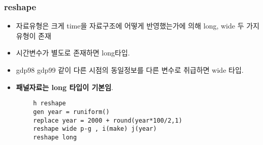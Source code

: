\documentclass[aspectratio=169,xcolor=dvipsnames,handout]{beamer}
\begin{document}
\begin{frame}
    \frametitle{reshape}
    \begin{itemize}[<+->]
        \item 자료유형은 크게 time을 자료구조에 어떻게 반영했는가에 의해 long, wide 두 가지 유형이 존재
        \item 시간변수가 별도로 존재하면 long타입.
        \item gdp98 gdp99 같이 다른 시점의 동일정보를 다른 변수로 취급하면 wide 타입.
        \item \textbf{패널자료는 long 타입이 기본임}.
    \end{itemize}
    \begin{verbatim}
        h reshape
        gen year = runiform()
        replace year = 2000 + round(year*100/2,1)
        reshape wide p-g , i(make) j(year)
        reshape long
    \end{verbatim}
\end{frame}

\end{document}
